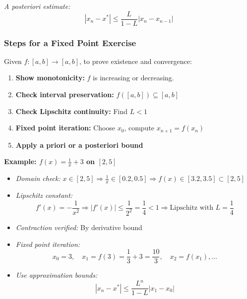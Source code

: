 \emph{A posteriori estimate:}
\[
|x_n - x^*| \le \frac{L}{1 - L} |x_n - x_{n-1}|
\]

\subsubsection{Steps for a Fixed Point Exercise}

Given \(f: [a, b] \to [a, b]\), to prove existence and convergence:

\begin{enumerate}
    \item \textbf{Show monotonicity:} \(f\) is increasing or decreasing.
    \item \textbf{Check interval preservation:} \(f([a, b]) \subseteq [a, b]\)
    \item \textbf{Check Lipschitz continuity:} Find \(L < 1\)
    \item \textbf{Fixed point iteration:} Choose \(x_0\), compute \(x_{n+1} = f(x_n)\)
    \item \textbf{Apply a priori or a posteriori bound}
\end{enumerate}

\textbf{Example: \(f(x) = \frac{1}{x} + 3\) on \([2, 5]\)}

\begin{itemize}[label=\(-\)]
\item \emph{Domain check:} \(x \in [2, 5] \Rightarrow \frac{1}{x} \in [0.2, 0.5] \Rightarrow f(x) \in [3.2, 3.5] \subset [2, 5]\)
\item \emph{Lipschitz constant:}
\[
f'(x) = -\frac{1}{x^2} \Rightarrow |f'(x)| \le \frac{1}{2^2} = \frac{1}{4} < 1
\Rightarrow \text{Lipschitz with } L = \frac{1}{4}
\]
\item \emph{Contraction verified:} By derivative bound
\item \emph{Fixed point iteration:}
\[
x_0 = 3, \quad x_1 = f(3) = \frac{1}{3} + 3 = \frac{10}{3}, \quad x_2 = f(x_1), \dots
\]
\item \emph{Use approximation bounds:}
\[
|x_n - x^*| \le \frac{L^n}{1 - L} |x_1 - x_0|
\]
\end{itemize}